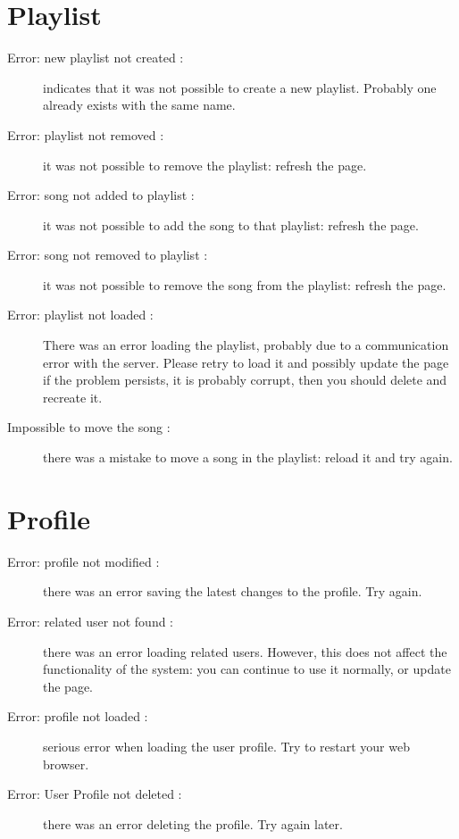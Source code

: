\section{Playlist}
\begin{description}
	\item [Error: new playlist not created :] indicates that it was not possible
	to create a new playlist. Probably one already exists with the same name.
	\item [Error: playlist not removed :] it was not possible
	to remove the playlist: refresh the page.
	\item [Error: song not added to playlist :] it was not possible
	to add the song to that playlist: refresh the page.
	\item [Error: song not removed to playlist :] it was not possible
	to remove the song from the playlist: refresh the page.
	\item [Error: playlist not loaded :] There was an error loading the playlist, 
	probably due to a communication error with the server. Please retry to load it
	and possibly update the page if the problem persists, it is probably corrupt,
	then you should delete and recreate it.
	\item [Impossible to move the song :] there was a mistake to move a song in the
	playlist: reload it and try again.
\end{description}

\section{Profile}
\begin{description}
	\item[Error: profile not modified :] there was an error saving the latest
	changes to the profile. Try again.
	\item[Error: related user not found :] there was an error loading related
	users. However, this does not affect the functionality of the
	system: you can continue to use it normally, or update the page.
	\item[Error: profile not loaded :] serious error when loading the user profile.
	Try to restart your web browser.
	\item[Error: User Profile not deleted :] there was an error deleting the
	profile. Try again later.
\end{description}

